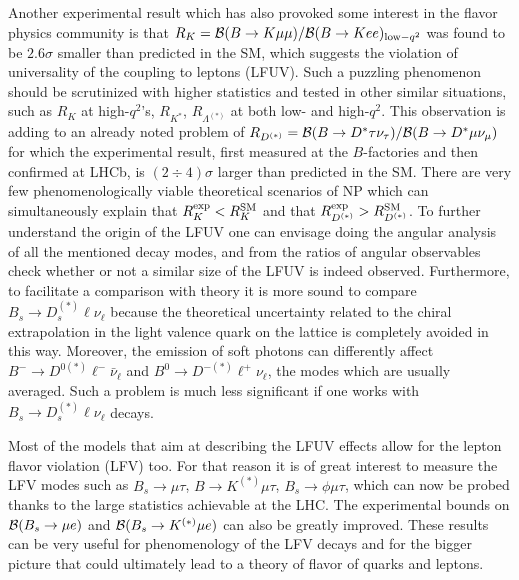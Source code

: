 Another experimental result which has also provoked some interest in the flavor physics community is that $R_K = {\cal B}(B\rightarrow K\mu\mu)/{\cal B}(B\rightarrow Kee)_{{\rm low}-q^2}$ was found to be $2.6\sigma$ smaller than  predicted in the SM, which suggests the violation of universality of the coupling to leptons (LFUV). Such a puzzling phenomenon should be scrutinized with higher statistics and tested in other similar situations, 
such as $R_K$ at high-$q^2$'s, $R_{K^\ast}$, $R_{\Lambda^{(\ast )}}$ at both low- and high-$q^2$. This observation is adding to an already noted problem of $R_{D^{(\ast)}}=  {\cal B}(B\rightarrow D^{\ast}\tau\nu_\tau)/{\cal B}(B\rightarrow D^{\ast}\mu\nu_\mu)$ for which the experimental result, first measured at the $B$-factories and then confirmed at LHCb, is $(2\div 4)\sigma$ larger than predicted in the SM. There are very few phenomenologically viable theoretical scenarios of NP which can simultaneously explain that $R_K^{\rm exp}<R_K^{\rm SM}$ and that $R_{D^{(\ast )}}^{\rm exp} > R_{D^{(\ast )}}^{\rm SM}$. To further understand the origin of the LFUV one can envisage doing the angular analysis of all the mentioned decay modes, and from the ratios of angular observables check whether or not a similar size of the LFUV is indeed observed. 
Furthermore, to facilitate a comparison with theory it is more sound to compare $B_s\to D_s^{(\ast)}\ell \nu_\ell$ because the theoretical uncertainty related to the chiral extrapolation in the light valence quark on the lattice is completely avoided in this way. Moreover, the emission of soft photons can differently affect $B^- \to D^{0 (\ast)}\ell^- \bar \nu_\ell$ and $B^0 \to D^{- (\ast)}\ell^+ \nu_\ell$, the modes which are usually averaged. Such a problem is much less significant if one works with $B_s\to D_s^{(\ast)}\ell \nu_\ell$ decays. 

Most of the models that aim at describing  the LFUV effects allow for the lepton flavor violation (LFV) too. For that reason it is of great interest to measure the LFV modes such as $B_s\to \mu \tau$, $B\to K^{(\ast )}\mu \tau$,  $B_s\to \phi \mu \tau$, which can now be probed thanks to the large statistics achievable at the LHC. The experimental bounds on ${\cal B}(B_s\rightarrow \mu e)$ and ${\cal B}(B_s\rightarrow K^{(\ast )} \mu e)$ can also be greatly improved. These results can be very useful for phenomenology of the LFV decays and for the bigger picture that could ultimately lead to a theory of flavor of quarks and leptons. 

